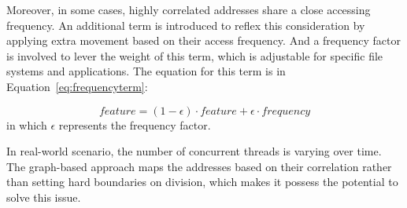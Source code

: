 Moreover, in some cases, highly correlated addresses share a close accessing frequency.
An additional term is introduced to reflex this consideration by applying extra movement based on their access frequency.
And a frequency factor is involved to lever the weight of this term, which is adjustable for specific file systems and applications.
The equation for this term is in Equation~\ref{eq:frequencyterm}:

\begin{equation}
\label{eq:frequencyterm}
feature = (1 - \epsilon) \cdot feature + \epsilon \cdot frequency
\end{equation}
in which $\epsilon$ represents the frequency factor.

In real-world scenario, the number of concurrent threads is varying over time.
The graph-based approach maps the addresses based on their correlation rather than setting hard boundaries on division,
which makes it possess the potential to solve this issue.


